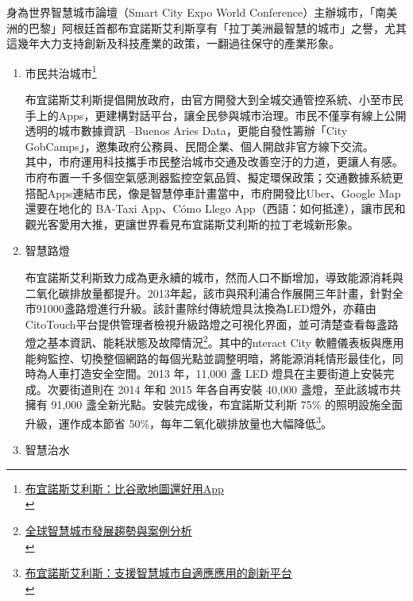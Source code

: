 \documentclass[a4paper,12pt]{article}
\begin{document}
\begin{enumerate}
身為世界智慧城市論壇（Smart City Expo World Conference）主辦城市，「南美洲的巴黎」阿根廷首都布宜諾斯艾利斯享有「拉丁美洲最智慧的城市」之譽，尤其這幾年大力支持創新及科技產業的政策，一翻過往保守的產業形象。\\

\begin{enumerate}
\item 市民共治城市\footnote{\href{https://futurecity.cw.com.tw/article/226}{布宜諾斯艾利斯：比谷歌地圖還好用App}\\}
\label{sec:orgcdfdba6}

布宜諾斯艾利斯提倡開放政府，由官方開發大到全城交通管控系統、小至市民手上的Apps，更建構對話平台，讓全民參與城市治理。市民不僅享有線上公開透明的城市數據資訊 –Buenos Aries Data，更能自發性籌辦「City GobCamps」，邀集政府公務員、民間企業、個人開啟非官方線下交流。\\

其中，市府運用科技攜手市民整治城市交通及改善空汙的力道，更讓人有感。市府布置一千多個空氣感測器監控空氣品質、擬定環保政策；交通數據系統更搭配Apps連結市民，像是智慧停車計畫當中，市府開發比Uber、Google Map還要在地化的 BA-Taxi App、Cómo Llego App（西語：如何抵達），讓市民和觀光客愛用大推，更讓世界看見布宜諾斯艾利斯的拉丁老城新形象。\\

\item 智慧路燈
\label{sec:org5d762c3}

布宜諾斯艾利斯致力成為更永續的城市，然而人口不斷增加，導致能源消耗與二氧化碳排放量都提升。2013年起，該市與飛利浦合作展開三年計畫，針對全市91000盞路燈進行升級。該計畫除纣傳統燈具汰換為LED燈外，亦藉由CitoTouch平台提供管理者檢視升級路燈之可視化界面，並可清楚查看每盞路燈之基本資訊、能耗狀態及故障情況\footnote{\href{https://mic.iii.org.tw/bookstore/Book.aspx?sqno=878}{全球智慧城市發展趨勢與案例分析}\\}。其中的nteract City 軟體儀表板與應用能夠監控、切換整個網路的每個光點並調整明暗，將能源消耗情形最佳化，同時為人車打造安全空間。2013 年，11,000 盞 LED 燈具在主要街道上安裝完成。次要街道則在 2014 年和 2015 年各自再安裝 40,000 盞燈，至此該城市共擁有 91,000 盞全新光點。安裝完成後，布宜諾斯艾利斯 75\% 的照明設施全面升級，運作成本節省 50\%，每年二氧化碳排放量也大幅降低\footnote{\href{https://www.interact-lighting.com/zh-tw/case-studies/buenos-aires}{布宜諾斯艾利斯：支援智慧城市自適應應用的創新平台}\\}。\\

\item 智慧治水
\label{sec:org36e54d4}


\end{enumerate}
\end{enumerate}
\end{document}
